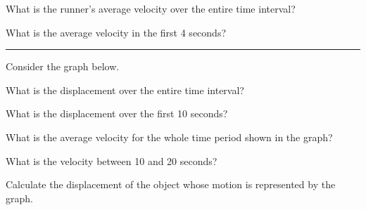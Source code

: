 \documentclass{article}
\begin{document}
\begin{exercise} \label{dixR7T}
    What is the runner’s average velocity over the entire time interval?
\end{exercise}

\begin{exercise} \label{YYxvX1}
   What is the average velocity in the first 4 seconds? 
\end{exercise}


\hrule

\vspace{1em}

Consider the graph below.

\begin{center}
\end{center}

\begin{exercise} \label{5Wd4QG}
    What is the displacement over the entire time interval?
\end{exercise}


\begin{exercise} \label{OselF0}
   What is the displacement over the first 10 seconds? 
\end{exercise}


\begin{exercise} \label{ZRQnM6}
    What is the average velocity for the whole time period shown in the graph?
\end{exercise}

\begin{exercise} \label{fZtSlq}
    What is the velocity between 10 and 20 seconds?
\end{exercise}


\begin{exercise} \label{E3dHaa}
    Calculate the displacement of the object whose motion is represented by the graph.
\end{exercise}
\end{document}
